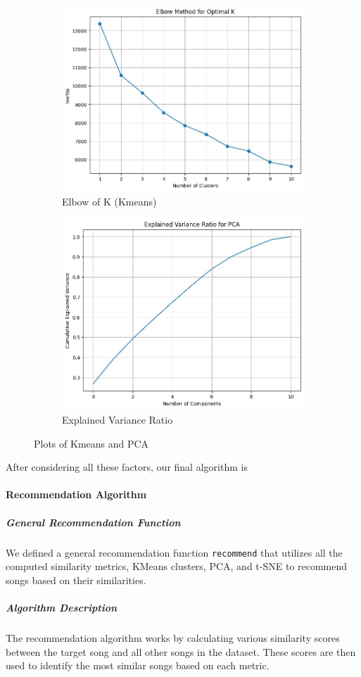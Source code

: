 \documentclass[a4paper, 24pt]{article}
\begin{document}
\begin{figure}[H]
    \centering
    \begin{subfigure}{0.45\textwidth}
        \centering
        \includegraphics[width=0.5\linewidth]{WhatsApp Image 2024-04-21 at 01.14.47_4e83dc25.jpg}
        \caption{Elbow of K (Kmeans)}
        \label{fig:elbow_k_kmeans}
    \end{subfigure}
    \hfill
    \begin{subfigure}{0.45\textwidth}
        \centering
        \includegraphics[width=0.5\linewidth]{WhatsApp Image 2024-04-21 at 01.14.54_45ade944.jpg}
        \caption{Explained Variance Ratio}
        \label{fig:exp_var_pca}
        \end{subfigure}
    \caption{Plots of Kmeans and PCA}
    \label{fig:combined_plots3}
\end{figure}
After considering all these factors, our final algorithm is
\paragraph{Recommendation Algorithm}
\subparagraph{General Recommendation Function}
We defined a general recommendation function \texttt{recommend} that utilizes all the computed similarity metrics, KMeans clusters, PCA, and t-SNE to recommend songs based on their similarities.

\subparagraph{Algorithm Description}
The recommendation algorithm works by calculating various similarity scores between the target song and all other songs in the dataset. These scores are then used to identify the most similar songs based on each metric.
\end{document}
